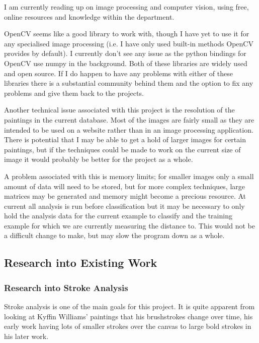 \documentclass[11pt,fleqn,twoside]{article}
\begin{document}
I am currently reading up on image processing and computer vision, using free,
online resources\cite{Prince2012Computer} and knowledge within the department.

OpenCV seems like a good library to work with, though I have yet to use it for any
specialised image processing (i.e. I have only used built-in methods OpenCV provides by default).
I currently don't see any issue as the python bindings for OpenCV use numpy in the background. Both
of these libraries are widely used and open source. If I do happen to have any problems with either
of these libraries there is a substantial community behind them and the option to fix any problems
and give them back to the projects.

Another technical issue associated with this project is the resolution of the paintings in the 
current database. Most of the images are fairly small as they are intended to be used on a website
rather than in an image processing application. There is potential that I may be able to get a hold
of larger images for certain paintings, but if the techniques could be made to work on the current
size of image it would probably be better for the project as a whole.

A problem associated with this is memory limits; for smaller images only a small amount of data
will need to be stored, but for more complex techniques, large matrices may be generated and memory
might become a precious resource. At current all analysis is run before classification but it may
be necessary to only hold the analysis data for the current example to classify and the training 
example for which we are currently measuring the distance to. This would not be a difficult change
to make, but may slow the program down as a whole.

\clearpage
\subsection{Research into Existing Work}

\subsubsection{Research into Stroke Analysis}
Stroke analysis is one of the main goals for this project. It is quite apparent from looking at 
Kyffin Williams' paintings that his brushstrokes change over time, his early work having lots of
smaller strokes over the canvas to large bold strokes in his later work.
\end{document}
